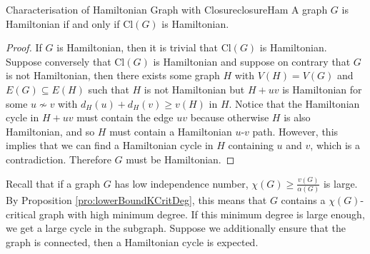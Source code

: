 \documentclass[math]{amznotes}
\theoremstyle{remark}
\newcommand{\0}{\mathbf{0}}
\newcommand{\1}{\mathbf{1}}
\begin{document}
\begin{probox}{Characterisation of Hamiltonian Graph with Closure}{closureHam}
    A graph $G$ is Hamiltonian if and only if $\mathrm{Cl}(G)$ is Hamiltonian.
    \tcblower
    \begin{proof}
        If $G$ is Hamiltonian, then it is trivial that $\mathrm{Cl}(G)$ is Hamiltonian. Suppose conversely that $\mathrm{Cl}(G)$ is Hamiltonian and suppose on contrary that $G$ is not Hamiltonian, then there exists some graph $H$ with $V(H) = V(G)$ and $E(G) \subseteq E(H)$ such that $H$ is not Hamiltonian but $H + uv$ is Hamiltonian for some $u \not\sim v$ with $d_H(u) + d_H(v) \geq v(H)$ in $H$. Notice that the Hamiltonian cycle in $H + uv$ must contain the edge $uv$ because otherwise $H$ is also Hamiltonian, and so $H$ must contain a Hamiltonian $u$-$v$ path. However, this implies that we can find a Hamiltonian cycle in $H$ containing $u$ and $v$, which is a contradiction. Therefore $G$ must be Hamiltonian.
    \end{proof}
\end{probox}
Recall that if a graph $G$ has low independence number, $\chi(G) \geq \frac{v(G)}{\alpha(G)}$ is large. By Proposition \ref{pro:lowerBoundKCritDeg}, this means that $G$ contains a $\chi(G)$-critical graph with high minimum degree. If this minimum degree is large enough, we get a large cycle in the subgraph. Suppose we additionally ensure that the graph is connected, then a Hamiltonian cycle is expected.
\end{document}
